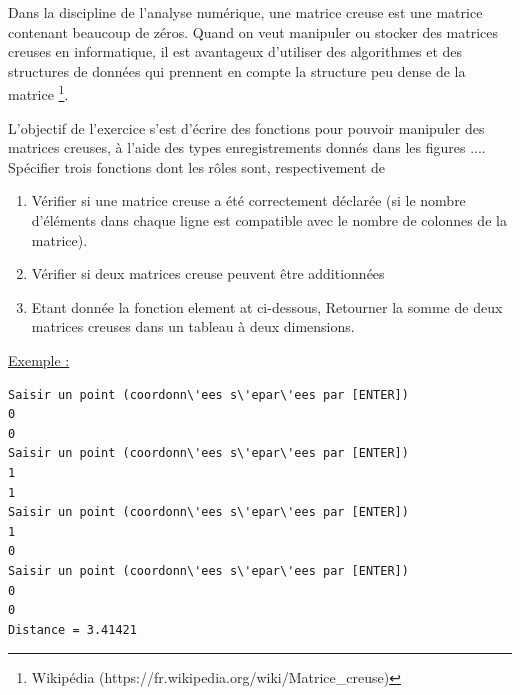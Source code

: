 \documentclass[11pt]{exam}
\begin{document}
\begin{questions}

\question Dans la discipline de l'analyse num\'erique, une matrice creuse est une matrice contenant beaucoup de z\'eros. Quand on veut manipuler ou stocker des matrices creuses en informatique, il est avantageux d'utiliser des algorithmes et des structures de données qui prennent en compte la structure peu dense de la matrice \footnote{Wikip\'edia (https://fr.wikipedia.org/wiki/Matrice\_creuse)}. 

L'objectif de l'exercice s'est d'\'ecrire des fonctions pour pouvoir manipuler des matrices creuses, \`a l'aide des types enregistrements donnés dans les figures .... Sp\'ecifier trois fonctions dont les r\^oles sont, respectivement de
\begin{enumerate}[label=\alph*)]
\item V\'erifier si une matrice creuse a \'et\'e correctement d\'eclar\'ee (si le nombre d'\'el\'ements dans chaque ligne est compatible avec le nombre de colonnes de la matrice).
\item V\'erifier si deux matrices creuse peuvent \^etre additionnées
\item Etant donnée la fonction element at ci-dessous, Retourner la somme de deux matrices creuses dans un tableau à deux dimensions.
\end{enumerate}

\underline{Exemple :} 

\begin{Verbatim}
Saisir un point (coordonn\'ees s\'epar\'ees par [ENTER])
0
0
Saisir un point (coordonn\'ees s\'epar\'ees par [ENTER])
1
1
Saisir un point (coordonn\'ees s\'epar\'ees par [ENTER])
1
0
Saisir un point (coordonn\'ees s\'epar\'ees par [ENTER])
0
0
Distance = 3.41421
\end{Verbatim}

\end{questions}
\end{document}
